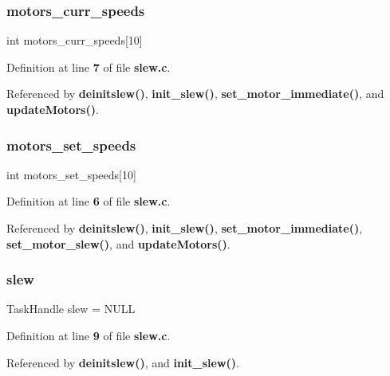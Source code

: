 \subsubsection{motors\+\_\+curr\+\_\+speeds}
{\footnotesize\ttfamily int motors\+\_\+curr\+\_\+speeds[10]\hspace{0.3cm}{\ttfamily [static]}}



Definition at line \textbf{ 7} of file \textbf{ slew.\+c}.



Referenced by \textbf{ deinitslew()}, \textbf{ init\+\_\+slew()}, \textbf{ set\+\_\+motor\+\_\+immediate()}, and \textbf{ update\+Motors()}.

\mbox{\label{slew_8c_acf7558ed17fdecd298ea7eb82291c7d0}} 
\subsubsection{motors\+\_\+set\+\_\+speeds}
{\footnotesize\ttfamily int motors\+\_\+set\+\_\+speeds[10]\hspace{0.3cm}{\ttfamily [static]}}



Definition at line \textbf{ 6} of file \textbf{ slew.\+c}.



Referenced by \textbf{ deinitslew()}, \textbf{ init\+\_\+slew()}, \textbf{ set\+\_\+motor\+\_\+immediate()}, \textbf{ set\+\_\+motor\+\_\+slew()}, and \textbf{ update\+Motors()}.

\mbox{\label{slew_8c_a9dc30877eadbb32ceb6bede027c9a93f}} 
\subsubsection{slew}
{\footnotesize\ttfamily Task\+Handle slew = N\+U\+LL\hspace{0.3cm}{\ttfamily [static]}}



Definition at line \textbf{ 9} of file \textbf{ slew.\+c}.



Referenced by \textbf{ deinitslew()}, and \textbf{ init\+\_\+slew()}.

\mbox{\label{slew_8c_a29ddd4c66a52ff81b441d04f9f6d9318}} 
